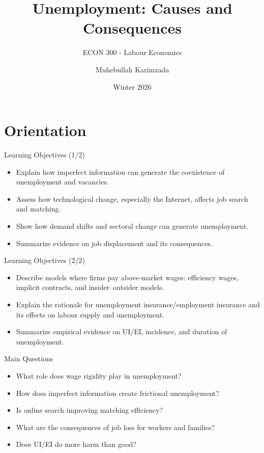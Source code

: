 \documentclass[aspectratio=169]{beamer}
\title{\textbf{Unemployment: Causes and Consequences}}
\subtitle{{\large ECON 300 - Labour Economics}}
\author{Muhebullah Karimzada}
\date{Winter 2026}
\begin{document}
\begin{frame}[plain]
  \titlepage
\end{frame}

\section{Orientation}

\begin{frame}{Learning Objectives (1/2)}
\transfade
\begin{itemize}[<+->]
  \item Explain how imperfect information can generate the coexistence of unemployment and vacancies.
  \item Assess how technological change, especially the Internet, affects job search and matching.
  \item Show how demand shifts and sectoral change can generate unemployment.
  \item Summarize evidence on job displacement and its consequences.
\end{itemize}

\end{frame}

\begin{frame}{Learning Objectives (2/2)}
\transfade
\begin{itemize}[<+->]
  \item Describe models where firms pay above-market wages: efficiency wages, implicit contracts, and insider--outsider models.
  \item Explain the rationale for unemployment insurance/employment insurance and its effects on labour supply and unemployment.
  \item Summarize empirical evidence on UI/EI, incidence, and duration of unemployment.
\end{itemize}


\end{frame}

\begin{frame}{Main Questions}
\transfade
\begin{itemize}[<+->]
  \item What role does wage rigidity play in unemployment?
  \item How does imperfect information create frictional unemployment?
  \item Is online search improving matching efficiency?
  \item What are the consequences of job loss for workers and families?
  \item Does UI/EI do more harm than good?
\end{itemize}


\end{frame}
\end{document}
